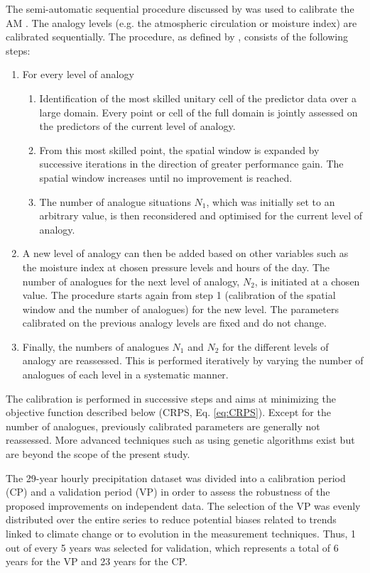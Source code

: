 \documentclass[hess, manuscript]{copernicus}
\begin{document}
	The semi-automatic sequential procedure discussed by \citet{Bontron2004} was used to calibrate the AM \citep{Radanovics2013, BenDaoud2016}. The analogy levels (e.g. the atmospheric circulation or moisture index) are calibrated sequentially. The procedure, as defined by \citet{Bontron2004}, consists of the following steps:
	
	\begin{enumerate}
		\item For every level of analogy
		\begin{enumerate}
			\item Identification of the most skilled unitary cell of the predictor data over a large domain. Every point or cell of the full domain is jointly assessed on the predictors of the current level of analogy.
			\item From this most skilled point, the spatial window is expanded by successive iterations in the direction of greater performance gain. The spatial window increases until no improvement is reached.
			\item The number of analogue situations $N_{1}$, which was initially set to an arbitrary value, is then reconsidered and optimised for the current level of analogy.
		\end{enumerate}
		\item A new level of analogy can then be added based on other variables such as the moisture index at chosen pressure levels and hours of the day. The number of analogues for the next level of analogy, $N_{2}$, is initiated at a chosen value. The procedure starts again from step 1 (calibration of the spatial window and the number of analogues) for the new level. The parameters calibrated on the previous analogy levels are fixed and do not change. 
		\item Finally, the numbers of analogues $N_{1}$ and $N_{2}$ for the different levels of analogy are reassessed. This is performed iteratively by varying the number of analogues of each level in a systematic manner.
	\end{enumerate}
	
	The calibration is performed in successive steps and aims at minimizing the objective function described below (CRPS, Eq. \ref{eq:CRPS}). Except for the number of analogues, previously calibrated parameters are generally not reassessed. More advanced techniques such as using genetic algorithms \citep{Horton2017} exist but are beyond the scope of the present study.
	
	The 29-year hourly precipitation dataset was divided into a calibration period (CP) and a validation period (VP) in order to assess the robustness of the proposed improvements on independent data. The selection of the VP was evenly distributed over the entire series \citep{BenDaoud2010} to reduce potential biases related to trends linked to climate change or to evolution in the measurement techniques. Thus, 1 out of every 5 years was selected for validation, which represents a total of 6 years for the VP and 23 years for the CP.
	
\end{document}
